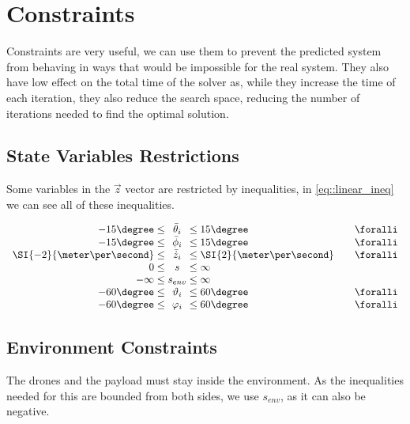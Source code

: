 \section{Constraints}
Constraints are very useful, we can use them to prevent the predicted system from behaving in ways that would be impossible for the real system. They also have low effect on the total time of the solver as, while they increase the time of each iteration, they also reduce the search space, reducing the number of iterations needed to find the optimal solution.

 
\label{sect::constraints}
\subsection{State Variables Restrictions}
\label{subsect::linear_ineq}
Some variables in the $\vec z$ vector are restricted by inequalities, in \cref{eq::linear_ineq} we can see all of these inequalities.

\begin{equation}
\begin{array}{r @{{}\le{}} c @{{}\le{}} l @{\qquad} l}
-15\degree & \bar \theta_i & 15\degree & \foralli\\
-15\degree & \bar \phi_i   & 15\degree & \foralli\\
\SI{-2}{\meter\per\second} & \bar{\dot z}_i & \SI{2}{\meter\per\second} & \foralli\\
0    & s        & \infty \\
-\infty & s_{env} & \infty \\
-60\degree & \vartheta_i & 60\degree & \foralli\\
-60\degree & \varphi_i   & 60\degree & \foralli\\
\end{array}
\label{eq::linear_ineq}
\end{equation}


\subsection{Environment Constraints}
The drones and the payload must stay inside the environment. As the inequalities needed for this are bounded from both sides, we use $s_{env}$, as it can also be negative.

